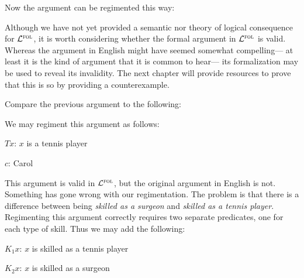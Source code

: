 Now the argument can be regimented this way:

\begin{earg} \label{surgeon2}
\end{earg}

Although we have not yet provided a semantic nor theory of logical consequence for $\mathcal{L}^{\textsc{fol}}$, it is worth considering whether the formal argument in $\mathcal{L}^{\textsc{fol}}$ is valid. 
Whereas the argument in English might have seemed somewhat compelling--- at least it is the kind of argument that it is common to hear--- its formalization may be used to reveal its invalidity.
The next chapter will provide resources to prove that this is so by providing a counterexample.

Compare the previous argument to the following:

\begin{earg} \label{surgeon3}
\end{earg}

We may regiment this argument as follows:

\begin{multicols}{2}

\begin{earg}
\end{earg}

\begin{ekey}
  \item[$Tx$:] $x$ is a tennis player
  \item[$c$:] Carol
\end{ekey}

\end{multicols}

This argument is valid in $\mathcal{L}^{\textsc{fol}}$, but the original argument in English is not.
Something has gone wrong with our regimentation.
The problem is that there is a difference between being \emph{skilled as a surgeon} and \emph{skilled as a tennis player}.
Regimenting this argument correctly requires two separate predicates, one for each type of skill.
Thus we may add the following:

\begin{ekey}
  \item[$K_1x$:] $x$ is skilled as a tennis player
  \item[$K_2x$:] $x$ is skilled as a surgeon
\end{ekey}

